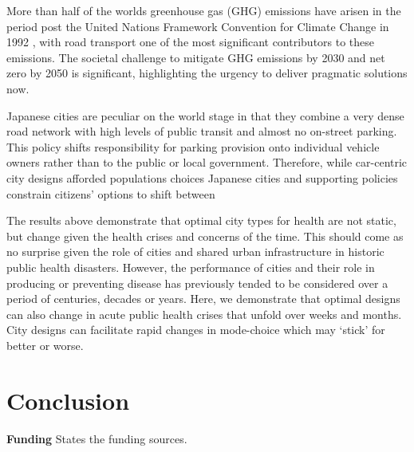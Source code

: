 \documentclass[preprint,12pt]{elsarticle}
\begin{document}
More than half of the worlds greenhouse gas (GHG) emissions have arisen in the period post the United Nations Framework Convention for Climate Change in 1992 \cite{bashmakov2022climate}, with road transport one of the most significant contributors to these emissions. The societal challenge to mitigate GHG emissions by 2030 and net zero by 2050 \cite{lynskey2020moving} is significant, highlighting the urgency to deliver pragmatic solutions now.

Japanese cities are peculiar on the world stage in that they combine a very dense road network with high levels of public transit and almost no on-street parking. This policy shifts responsibility for parking provision onto individual vehicle owners rather than to the public or local government. Therefore, while car-centric city designs afforded populations choices Japanese cities and supporting policies constrain citizens' options to shift between 

The results above demonstrate that optimal city types for health are not static, but change given the health crises and concerns of the time. This should come as no surprise given the role of cities and shared urban infrastructure in historic public health disasters. However, the performance of cities and their role in producing or preventing disease has previously tended to be considered over a period of centuries, decades or years. Here, we demonstrate that optimal designs can also change in acute public health crises that unfold over weeks and months. City designs can facilitate rapid changes in mode-choice which may `stick' for better or worse. 



\section*{Conclusion}

\textbf{Funding} States the funding sources.

\end{document}
